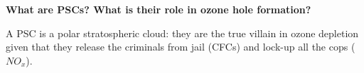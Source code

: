 \textbf{What are PSCs? What is their role in ozone hole formation?}

A PSC is a polar stratospheric cloud: they are the true villain in ozone
depletion given that they release the criminals from jail (CFCs) and lock-up
all the cops ($NO_{x}$).

